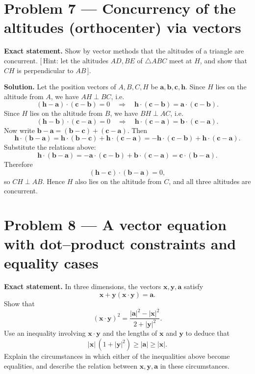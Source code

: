 \documentclass[12pt,a4paper]{article}
\theoremstyle{plain}
\theoremstyle{definition}      %
\begin{document}
\section*{Problem 7 — Concurrency of the altitudes (orthocenter) via vectors}

\textbf{Exact statement.}
Show by vector methods that the altitudes of a triangle are concurrent.
\([\,\)Hint: let the altitudes \(AD,BE\) of \(\triangle ABC\) meet at \(H\), and show that \(CH\) is perpendicular to \(AB\,]\).

\textbf{Solution.}
Let the position vectors of \(A,B,C,H\) be \(\mathbf a,\mathbf b,\mathbf c,\mathbf h\).
Since \(H\) lies on the altitude from \(A\), we have \(AH\perp BC\), i.e.
\[
(\mathbf h-\mathbf a)\cdot(\mathbf c-\mathbf b)=0
\quad\Longrightarrow\quad
\mathbf h\cdot(\mathbf c-\mathbf b)=\mathbf a\cdot(\mathbf c-\mathbf b).
\]
Since \(H\) lies on the altitude from \(B\), we have \(BH\perp AC\), i.e.
\[
(\mathbf h-\mathbf b)\cdot(\mathbf c-\mathbf a)=0
\quad\Longrightarrow\quad
\mathbf h\cdot(\mathbf c-\mathbf a)=\mathbf b\cdot(\mathbf c-\mathbf a).
\]
Now write \(\mathbf b-\mathbf a=(\mathbf b-\mathbf c)+(\mathbf c-\mathbf a)\). Then
\[
\mathbf h\cdot(\mathbf b-\mathbf a)
=\mathbf h\cdot(\mathbf b-\mathbf c)+\mathbf h\cdot(\mathbf c-\mathbf a)
=-\mathbf h\cdot(\mathbf c-\mathbf b)+\mathbf h\cdot(\mathbf c-\mathbf a).
\]
Substitute the relations above:
\[
\mathbf h\cdot(\mathbf b-\mathbf a)
=-\mathbf a\cdot(\mathbf c-\mathbf b)+\mathbf b\cdot(\mathbf c-\mathbf a)
=\mathbf c\cdot(\mathbf b-\mathbf a).
\]
Therefore
\[
(\mathbf h-\mathbf c)\cdot(\mathbf b-\mathbf a)=0,
\]
so \(CH\perp AB\). Hence \(H\) also lies on the altitude from \(C\), and all three altitudes are concurrent.

\section*{Problem 8 — A vector equation with dot–product constraints and equality cases}

\textbf{Exact statement.}
In three dimensions, the vectors \(\mathbf x,\mathbf y,\mathbf a\) satisfy
\[
\mathbf x+\mathbf y(\mathbf x\cdot \mathbf y)=\mathbf a.
\]
Show that
\[
(\mathbf x\cdot \mathbf y)^2=\frac{|\mathbf a|^2-|\mathbf x|^2}{2+|\mathbf y|^2}.
\]
Use an inequality involving \(\mathbf x\cdot \mathbf y\) and the lengths of \(\mathbf x\) and \(\mathbf y\) to deduce that
\[
|\mathbf x|\,(1+|\mathbf y|^2)\ge |\mathbf a|\ge |\mathbf x|.
\]
Explain the circumstances in which either of the inequalities above become equalities, and describe the relation between
\(\mathbf x,\mathbf y,\mathbf a\) in these circumstances.
\end{document}
